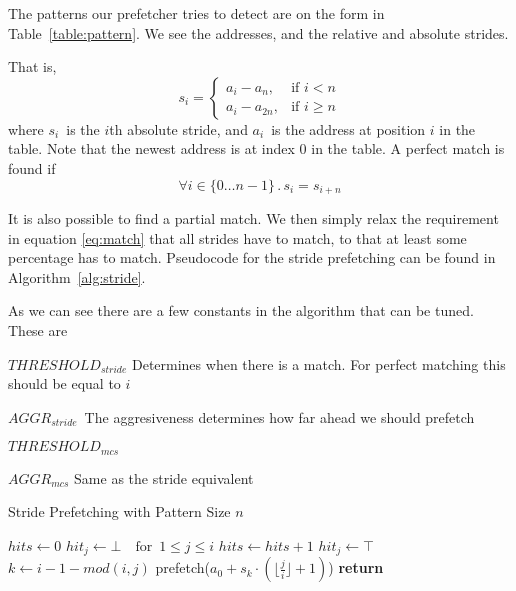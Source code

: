 The patterns our prefetcher tries to detect are on the form in
Table~\ref{table:pattern}.
We see the addresses, and the relative and absolute strides.


That is,
\[
	s_i = \begin{cases}
		a_i - a_n,    & \text{if } i  < n \\%
		a_i - a_{2n}, & \text{if } i \geq n %
	\end{cases}
\]
where $s_i$~is the $i$th absolute stride, and $a_i$~is the address at position
$i$ in the table. Note that the newest address is at index 0 in the table. A
perfect match is found if
\begin{equation}
\label{eq:match}
\forall i \in \{0 \dots n - 1\} \,.\, s_i = s_{i + n}
\end{equation}

It is also possible to find a partial match. We then simply relax the
requirement in equation \eqref{eq:match} that all strides have to match, to
that at least some percentage has to match. Pseudocode for the stride
prefetching can be found in Algorithm~\ref{alg:stride}.

As we can see there are a few constants in the algorithm that can be
tuned. These are

\begin{description}
	\item{$THRESHOLD_{stride}$} Determines when there is a match. For perfect
	matching this should be equal to $i$
	\item{$AGGR_{stride}$} The aggresiveness determines how far ahead we should
	prefetch
	\item{$THRESHOLD_{mcs}$}
	\item{$AGGR_{mcs}$} Same as the stride equivalent
\end{description}


\begin{algorithm}
	\caption{Stride Prefetching with Pattern Size $n$}
	\label{alg:stride}
	\begin{algorithmic}
			\State $hits \gets 0$
			\State $hit_j \gets \bot \quad \text{for } \, 1 \leq j \leq i$
					\State $hits \gets hits + 1$
					\State $hit_j \gets \top$
				\EndIf
			\EndFor
				\State $k \gets i - 1 - mod(i,j)$
					\State prefetch($a_0 + s_k \cdot (\lfloor \frac{j}{i} \rfloor + 1)$)
					\EndIf
				\EndFor
				\State \bfseries return
			\EndIf
		\EndFor
	\end{algorithmic}
\end{algorithm}

